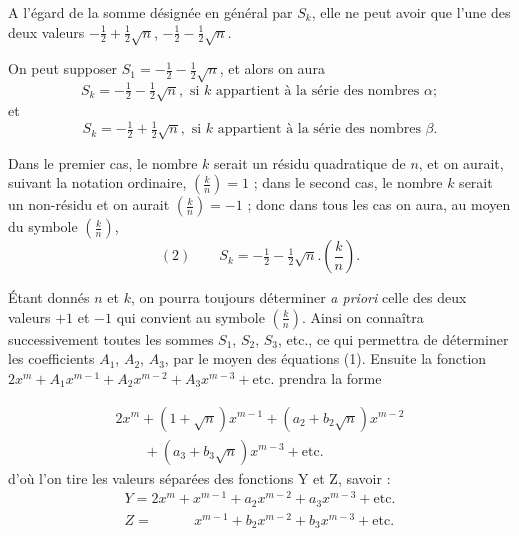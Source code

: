 \documentclass[11pt,a4paper]{article}
\begin{document}
A l'égard de la somme désignée en général par $S_k$, elle ne peut avoir
que l'une des deux valeurs $-\frac{1}{2} + \frac{1}{2}\sqrt{n}$,
$-\frac{1}{2} - \frac{1}{2}\sqrt{n}$.

On peut supposer $S_1 = -\frac{1}{2} - \frac{1}{2}\sqrt{n}$, et alors on
aura
\[
S_k = -\tfrac{1}{2} - \tfrac{1}{2}\sqrt{n}, \text{ si } k \text{ appartient à la série des nombres } \alpha ;
\]
et
\[
S_k = -\tfrac{1}{2} + \tfrac{1}{2}\sqrt{n}, \text{ si } k \text{ appartient à la série des nombres } \beta .
\]

Dans le premier cas, le nombre $k$ serait un résidu quadratique de $n$, et
on aurait, suivant la notation ordinaire, $\left(\frac{k}{n}\right) = 1$ ;
dans le second cas, le nombre $k$ serait un non-résidu et on aurait
$\left(\frac{k}{n}\right) = -1$ ; donc dans tous les cas on aura, au moyen
du symbole $\left(\frac{k}{n}\right)$,
\[
(2) \qquad S_k = -\tfrac{1}{2} - \tfrac{1}{2}\sqrt{n}.\left(\frac{k}{n}\right).
\]

Étant donnés $n$ et $k$, on pourra toujours déterminer \emph{a priori}
celle des deux valeurs $+1$ et $-1$ qui convient au symbole
$\left(\frac{k}{n}\right)$. Ainsi on connaîtra successivement toutes les
sommes $S_1$, $S_2$, $S_3$, etc., ce qui permettra de déterminer les
coefficients $A_1$, $A_2$, $A_3$, par le moyen des équations (1). Ensuite
la fonction $2x^m + A_1 x^{m-1} + A_2 x^{m-2} + A_3 x^{m-3} + \text{etc.}$
prendra la forme


\[
\begin{array}{l}
2x^m + (1 + \sqrt{n})x^{m-1} + (a_2 + b_2\sqrt{n})x^{m-2} \\
\qquad + (a_3 + b_3\sqrt{n})x^{m-3} + \text{etc.}
\end{array}
\]
d'où l'on tire les valeurs séparées des fonctions Y et Z, savoir :
\[
\begin{array}{l}
Y = 2x^m + x^{m-1} + a_2 x^{m-2} + a_3 x^{m-3} + \text{etc.} \\
Z = \phantom{2x^m + {}} x^{m-1} + b_2 x^{m-2} + b_3 x^{m-3} + \text{etc.}
\end{array}
\]
\end{document}
